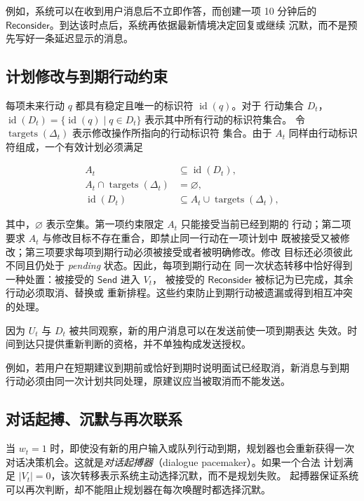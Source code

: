 \documentclass[manuscript,nonacm]{acmart}
\begin{document}
例如，系统可以在收到用户消息后不立即作答，而创建一项 10 分钟后的
$\mathsf{Reconsider}$。到达该时点后，系统再依据最新情境决定回复或继续
沉默，而不是预先写好一条延迟显示的消息。

\subsection{计划修改与到期行动约束}

每项未来行动 $q$ 都具有稳定且唯一的标识符 $\operatorname{id}(q)$。对于
行动集合 $D_t$，$\operatorname{id}(D_t)=
\{\operatorname{id}(q)\mid q\in D_t\}$ 表示其中所有行动的标识符集合。
令 $\operatorname{targets}(\Delta_t)$ 表示修改操作所指向的行动标识符
集合。由于 $A_t$ 同样由行动标识符组成，一个有效计划必须满足

\begin{align}
A_t &\subseteq \operatorname{id}(D_t), \\
A_t \cap \operatorname{targets}(\Delta_t) &= \varnothing, \\
\operatorname{id}(D_t) &\subseteq A_t \cup \operatorname{targets}(\Delta_t),
\end{align}

其中，$\varnothing$ 表示空集。第一项约束限定 $A_t$ 只能接受当前已经到期的
行动；第二项要求 $A_t$ 与修改目标不存在重合，即禁止同一行动在一项计划中
既被接受又被修改；第三项要求每项到期行动必须被接受或者被明确修改。修改
目标还必须彼此不同且仍处于 \textit{pending} 状态。因此，每项到期行动在
同一次状态转移中恰好得到一种处置：被接受的 $\mathsf{Send}$ 进入 $V_t$，
被接受的 $\mathsf{Reconsider}$ 被标记为已完成，其余行动必须取消、替换或
重新排程。这些约束防止到期行动被遗漏或得到相互冲突的处理。

因为 $U_t$ 与 $D_t$ 被共同观察，新的用户消息可以在发送前使一项到期表达
失效。时间到达只提供重新判断的资格，并不单独构成发送授权。

例如，若用户在短期建议到期前或恰好到期时说明面试已经取消，新消息与到期
行动必须由同一次计划共同处理，原建议应当被取消而不能发送。

\subsection{对话起搏、沉默与再次联系}

当 $w_t=1$ 时，即使没有新的用户输入或队列行动到期，规划器也会重新获得一次
对话决策机会。这就是\emph{对话起搏器}（dialogue pacemaker）。如果一个合法
计划满足 $|V_t|=0$，该次转移表示系统主动选择沉默，而不是规划失败。
起搏器保证系统可以再次判断，却不能阻止规划器在每次唤醒时都选择沉默。
\end{document}
